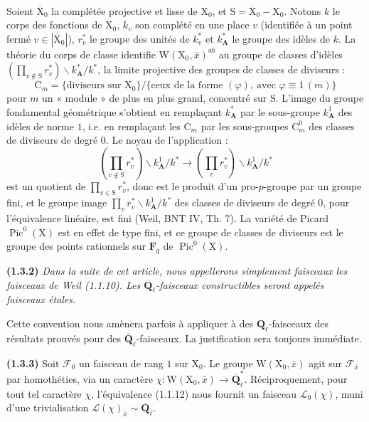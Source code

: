 \documentclass[11pt,leqno]{article}
\newcommand{\Page}[1]{\ifvmode\noindent\else\unskip\ \fi{\footnotesize\textcolor{gray}{[p.\,#1]}}\ \ignorespaces}
\begin{document}
\Page{157}

Soient \(\overline{\mathrm{X}}_0\) la complétée projective et lisse de \(\mathrm{X}_0\), et \(\mathrm{S}=\overline{\mathrm{X}}_0-\mathrm{X}_0\). Notons \(k\) le corps des fonctions de \(\mathrm{X}_0\), \(k_v\) son complété en une place \(v\) (identifiée à un point fermé \(v\in|\overline{\mathrm{X}}_0|\)), \(r_v^*\) le groupe des unités de \(k_v^*\) et \(k_{\mathbf{A}}^*\) le groupe des idèles de \(k\). La théorie du corps de classe identifie \(\mathrm{W}(\mathrm{X}_0,\bar{x})^{ab}\) au groupe de classes d’idèles \((\prod\limits_{v\notin\mathrm{S}}r_v^*)\backslash k_{\mathbf{A}}^*/k^*\), la limite projective des groupes de classes de diviseurs :
\[
\mathrm{C}_m
=\{\text{diviseurs sur }\mathrm{X}_0\}/
 \{\text{ceux de la forme }(\varphi),\ \text{avec }\varphi\equiv1\,(m)\}
\]
pour \(m\) un « module » de plus en plus grand, concentré sur \(\mathrm{S}\). L’image du groupe fondamental géométrique s’obtient en remplaçant \(k_{\mathbf{A}}^*\) par le sous-groupe \(k_{\mathbf{A}}^1\) des idèles de norme \(1\), i.e. en remplaçant les \(\mathrm{C}_m\) par les sous-groupes \(\mathrm{C}_m^0\) des classes de diviseurs de degré \(0\). Le noyau de l’application :
\[
(\prod_{v\notin\mathrm{S}}r_v^*)\backslash k_{\mathbf{A}}^1/k^*
\longrightarrow
(\prod_v r_v^*)\backslash k_{\mathbf{A}}^1/k^*
\]
est un quotient de \(\prod\limits_{v\in\mathrm{S}}r_v^*\), donc est le produit d’un pro-\(p\)-groupe par un groupe fini, et le groupe image \(\prod\limits_v r_v^*\backslash k_{\mathbf{A}}^1/k^*\) des classes de diviseurs de degré \(0\), pour l’équivalence linéaire, est fini (Weil, BNT IV, Th. 7). La variété de Picard \(\operatorname{Pic}^0(\mathrm{X})\) est en effet de type fini, et ce groupe de classes de diviseurs est le groupe des points rationnels sur \(\mathbf{F}_q\) de \(\operatorname{Pic}^0(\mathrm{X})\).

\textbf{(1.3.2)} \textit{Dans la suite de cet article, nous appellerons simplement \textup{faisceaux} les faisceaux de Weil \textup{(1.1.10)}. Les \(\overline{\mathbf{Q}}_\ell\)-faisceaux constructibles seront appelés \textup{faisceaux étales}.}

Cette convention nous amènera parfois à appliquer à des \(\mathbf{Q}_\ell\)-faisceaux des résultats prouvés pour des \(\overline{\mathbf{Q}}_\ell\)-faisceaux. La justification sera toujours immédiate.

\textbf{(1.3.3)} Soit \(\mathscr{F}_0\) un faisceau de rang \(1\) sur \(\mathrm{X}_0\). Le groupe \(\mathrm{W}(\mathrm{X}_0,\bar{x})\) agit sur \(\mathscr{F}_{\bar{x}}\) par homothéties, via un caractère \(\chi:\mathrm{W}(\mathrm{X}_0,\bar{x})\to\overline{\mathbf{Q}}_\ell^*\). Réciproquement, pour tout tel caractère \(\chi\), l’équivalence (1.1.12) nous fournit un faisceau \(\mathscr{L}_0(\chi)\), muni d’une trivialisation \(\mathscr{L}(\chi)_{\bar{x}}\sim\overline{\mathbf{Q}}_\ell\).
\end{document}
